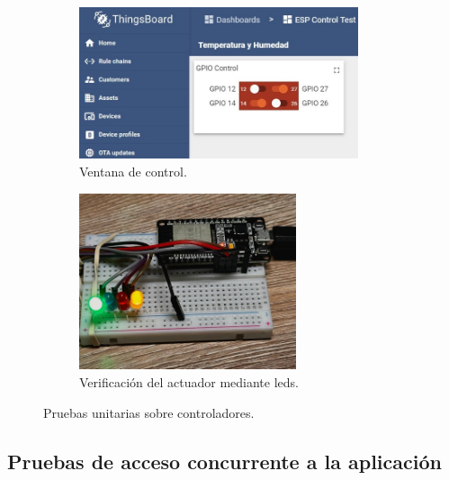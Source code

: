 \begin{figure}[htpb]
     \centering
       \begin{subfigure}[b]{0.50\textwidth}
	    \centering
		 \includegraphics[width=0.9\textwidth]{./Figures/chapter4/control_unit_test_1.jpg}
		\caption{Ventana de control.}
		\label{fig:control_test1}
     \end{subfigure}
          \hfill
     \begin{subfigure}[b]{0.45\textwidth}
		\centering
		\includegraphics[width=0.70\textwidth]{./Figures/chapter4/control_test2.jpg}
		\caption{Verificación del actuador mediante leds.}
		\label{fig:control_test2}
     \end{subfigure}
     \hfill
        \caption[Pruebas unitarias sobre controladores]{Pruebas unitarias sobre controladores.}
        \label{fig:control_test}
\end{figure}


\subsection{Pruebas de acceso concurrente a la aplicación}
\label{sec:Pruebas de acceso concurrente a la aplicación}



